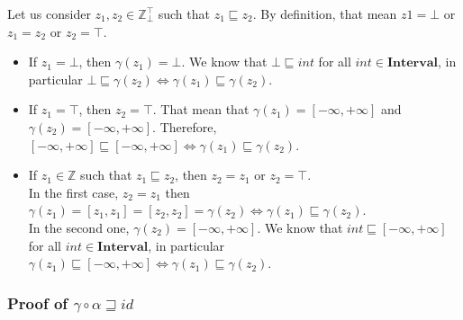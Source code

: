 \documentclass{article}
\newcommand{\interval}{\textbf{Interval}}
\newcommand{\ztop}{\mathbb{Z}_{\bot}^{\top}}
\newcommand{\zta}{\mathbb{Z}}
\begin{document}
Let us consider $z_1, z_2 \in \ztop$ such that $z_1 \sqsubseteq z_2$. By definition, that mean $z1 = \bot$ or $z_1 = z_2$ or $z_2 = \top$.

\begin{itemize}
    \item If $z_1 = \bot$, then $\gamma(z_1) = \bot$. We know that $\bot \sqsubseteq int$ for all $int  \in \interval$, in particular $\bot \sqsubseteq \gamma(z_2) \iff \gamma(z_1) \sqsubseteq \gamma(z_2)$.
    \item If $z_1 = \top$, then $z_2 = \top$. That mean that $\gamma(z_1) = \left[ -\infty, +\infty \right]$ and $\gamma(z_2) = \left[ -\infty, +\infty \right]$. Therefore, $\left[ -\infty, +\infty \right] \sqsubseteq \left[ -\infty, +\infty \right] \iff \gamma(z_1) \sqsubseteq \gamma(z_2)$. 
    \item If $z_1 \in \zta$ such that $z_1 \sqsubseteq z_2$, then $z_2 = z_1$ or $z_2 = \top$.\\
    In the first case, $z_2 = z_1$ then $\gamma(z_1) = [z_1,z_1] = [z_2,z_2] = \gamma(z_2) \iff \gamma(z_1) \sqsubseteq \gamma(z_2)$.\\
    In the second one, $\gamma(z_2) = \left[ -\infty, +\infty \right]$. We know that $int \sqsubseteq \left[ -\infty, +\infty \right]$ for all $int \in \interval$, in particular $\gamma(z_1) \sqsubseteq \left[ -\infty, +\infty \right] \iff \gamma(z_1) \sqsubseteq \gamma(z_2)$.
\end{itemize}
\subsubsection*{Proof of $\gamma \circ \alpha \sqsupseteq id$}
\end{document}
